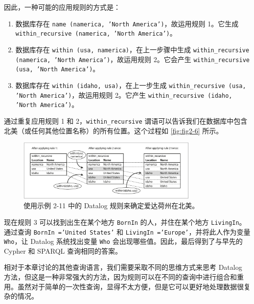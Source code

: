 因此，一种可能的应用规则的方式是：

\begin{enumerate}
    \item 数据库存在 \texttt{name (namerica, 'North America')}，故运用规则 1。它生成 \texttt{within\_recursive (namerica, 'North America')}。
    \item 数据库存在 \texttt{within (usa, namerica)}，在上一步骤中生成 \texttt{within\_recursive (namerica, 'North America')}，故运用规则 2。它会产生 \texttt{within\_recursive (usa, 'North America')}。
    \item 数据库存在 \texttt{within (idaho, usa)}，在上一步生成 \texttt{within\_recursive (usa, 'North America')}，故运用规则 2。它产生 \texttt{within\_recursive (idaho, 'North America')}。    
\end{enumerate}


通过重复应用规则 1 和 2，\texttt{within\_recursive} 谓语可以告诉我们在数据库中包含北美（或任何其他位置名称）的所有位置。这个过程如 \autoref{fig:fig2-6} 所示。

\begin{figure}[hbtp]
    \includegraphics[width=0.8\textwidth]{img/fig2-6.png}
    \caption{使用示例 2-11 中的 Datalog 规则来确定爱达荷州在北美。}
    \label{fig:fig2-6}
\end{figure}

现在规则 3 可以找到出生在某个地方 \texttt{BornIn} 的人，并住在某个地方 \texttt{LivingIn}。通过查询 \texttt{BornIn ='United States'} 和 \texttt{LivingIn ='Europe'}，并将此人作为变量 \texttt{Who}，让 Datalog 系统找出变量 \texttt{Who} 会出现哪些值。因此，最后得到了与早先的 Cypher 和 SPARQL 查询相同的答案。

相对于本章讨论的其他查询语言，我们需要采取不同的思维方式来思考 Datalog 方法，但这是一种非常强大的方法，因为规则可以在不同的查询中进行组合和重用。虽然对于简单的一次性查询，显得不太方便，但是它可以更好地处理数据很复杂的情况。